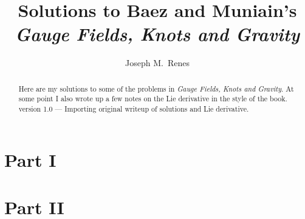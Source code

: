\documentclass[12pt]{article}
\author{Joseph M.\ Renes}
\title{Solutions to Baez and Muniain's \\\emph{Gauge Fields, Knots and Gravity}}
\newcounter{dummy}
\begin{document}
\renewcommand{\abstractname}{\vspace{-\baselineskip}}


\hypersetup{pageanchor=true}

\maketitle

\begin{abstract}
Here are my solutions to some of the problems in \emph{Gauge Fields, Knots and Gravity}. 
At some point I also wrote up a few notes on the Lie derivative in the style of the book.\\

version 1.0 --- Importing original writeup of solutions and Lie derivative.
\end{abstract}

\tableofcontents



\newpage

\section{Part I}













\section{Part II}
\setcounter{dummy}{1}
\setcounter{p}{0}



\setcounter{p}{54}









\end{document}
